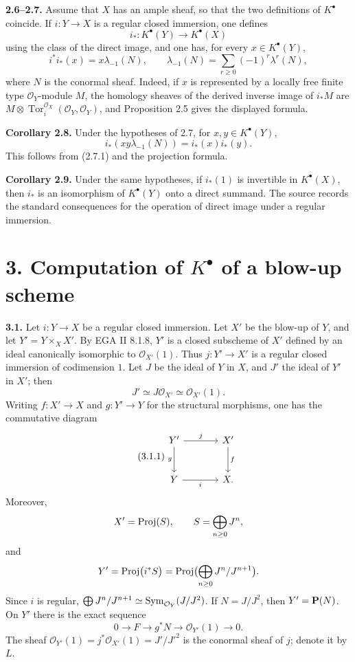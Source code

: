 \documentclass[11pt]{article}
\newcommand{\Tor}{\operatorname{Tor}}
\providecommand{\Tor}{\operatorname{Tor}}
\providecommand{\cO}{\mathcal O}
\begin{document}
\textbf{2.6--2.7.} Assume that \(X\) has an ample sheaf, so that the two definitions of \(K^\bullet\) coincide. If \(i:Y\to X\) is a regular closed immersion, one defines
\[
i_*:K^\bullet(Y)\to K^\bullet(X)
\]
using the class of the direct image, and one has, for every \(x\in K^\bullet(Y)\),
\begin{equation}\tag{2.7.1}
i^*i_*(x)=x\lambda_{-1}(N),
\qquad
\lambda_{-1}(N)=\sum_{r\ge0}(-1)^r\lambda^r(N),
\end{equation}
where \(N\) is the conormal sheaf. Indeed, if \(x\) is represented by a locally free finite type \(\cO_Y\)-module \(M\), the homology sheaves of the derived inverse image of \(i_*M\) are \(M\otimes\Tor_i^{\cO_X}(\cO_Y,\cO_Y)\), and Proposition 2.5 gives the displayed formula.

\textbf{Corollary 2.8.} Under the hypotheses of 2.7, for \(x,y\in K^\bullet(Y)\),
\begin{equation}\tag{2.8.1}
i_*(xy\lambda_{-1}(N))=i_*(x)i_*(y).
\end{equation}
This follows from (2.7.1) and the projection formula.

\textbf{Corollary 2.9.} Under the same hypotheses, if \(i_*(1)\) is invertible in \(K^\bullet(X)\), then \(i_*\) is an isomorphism of \(K^\bullet(Y)\) onto a direct summand. The source records the standard consequences for the operation of direct image under a regular immersion.

\section*{3. Computation of \texorpdfstring{$K^\bullet$}{K} of a blow-up scheme}

\textbf{3.1.} Let \(i:Y\to X\) be a regular closed immersion. Let \(X'\) be the blow-up of \(Y\), and let \(Y'=Y\times_X X'\). By EGA II 8.1.8, \(Y'\) is a closed subscheme of \(X'\) defined by an ideal canonically isomorphic to \(\cO_{X'}(1)\). Thus \(j:Y'\to X'\) is a regular closed immersion of codimension \(1\). Let \(J\) be the ideal of \(Y\) in \(X\), and \(J'\) the ideal of \(Y'\) in \(X'\); then
\[
J'\simeq J\cO_{X'}\simeq\cO_{X'}(1).
\]
Writing \(f:X'\to X\) and \(g:Y'\to Y\) for the structural morphisms, one has the commutative diagram
\begin{equation}\tag{3.1.1}
\begin{tikzcd}[column sep=large,row sep=large]
Y' \arrow[r,"j"] \arrow[d,"g"'] & X' \arrow[d,"f"]\\
Y \arrow[r,"i"'] & X.
\end{tikzcd}
\end{equation}
Moreover,
\[
X'=\operatorname{Proj}(S),\qquad S=\bigoplus_{n\ge0}J^n,
\]
and
\[
Y'=\operatorname{Proj}\bigl(i^*S\bigr)
=\operatorname{Proj}\bigl(\bigoplus_{n\ge0}J^n/J^{n+1}\bigr).
\]
Since \(i\) is regular, \(\bigoplus J^n/J^{n+1}\simeq\Sym_{\cO_Y}(J/J^2)\). If \(N=J/J^2\), then \(Y'=\mathbf P(N)\). On \(Y'\) there is the exact sequence
\begin{equation}\tag{3.1.2}
0\to F\to g^*N\to\cO_{Y'}(1)\to0.
\end{equation}
The sheaf \(\cO_{Y'}(1)=j^*\cO_{X'}(1)=J'/J'^2\) is the conormal sheaf of \(j\); denote it by \(L\).
\end{document}
